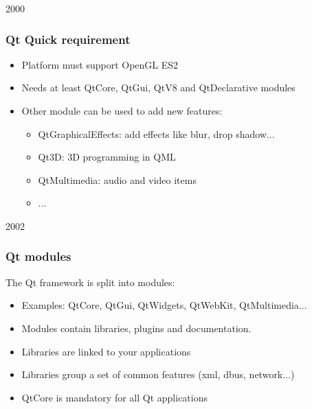 
\begin{slide}{2000}\frametitle{Qt Quick requirement}
\vspace*{1.5em}
\begin{itemize}
\item Platform must support OpenGL ES2
\item Needs at least QtCore, QtGui, QtV8 and QtDeclarative modules
\item Other module can be used to add new features:
\begin{itemize}
\item QtGraphicalEffects: add effects like blur, drop shadow...
\item Qt3D: 3D programming in QML
\item QtMultimedia: audio and video items
\item ...
\end{itemize}
\end{itemize}

\end{slide}

\begin{slide}{2002}\frametitle{Qt modules}
\vspace*{1.5em}
The Qt framework is split into modules:
\begin{itemize}
\item Examples: QtCore, QtGui, QtWidgets, QtWebKit, QtMultimedia...
\item Modules contain libraries, plugins and documentation.
\item Libraries are linked to your applications
\item Libraries group a set of common features (xml, dbus, network...)
\item QtCore is mandatory for all Qt applications
\end{itemize}
\end{slide}
